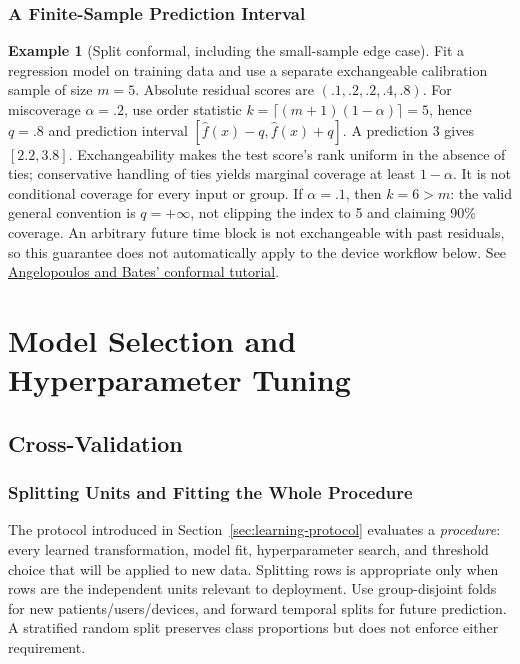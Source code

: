 \documentclass[11pt,twoside]{article}
\numberwithin{equation}{section}
\theoremstyle{plain}
\theoremstyle{definition}
\newtheorem{example}[theorem]{Example}
\theoremstyle{remark}
\begin{document}
\subsubsection{A Finite-Sample Prediction Interval}
\begin{example}[Split conformal, including the small-sample edge case]
Fit a regression model on training data and use a separate exchangeable
calibration sample of size $m=5$. Absolute residual scores are
$(.1,.2,.2,.4,.8)$. For miscoverage $\alpha=.2$, use order statistic
$k=\lceil(m+1)(1-\alpha)\rceil=5$, hence $q=.8$ and prediction interval
$[\hat f(x)-q,\hat f(x)+q]$. A prediction 3 gives $[2.2,3.8]$.
Exchangeability makes the test score's rank uniform in the absence of ties;
conservative handling of ties yields marginal coverage at least $1-\alpha$.
It is not conditional coverage for every input or group.
If $\alpha=.1$, then $k=6>m$: the valid general convention is $q=+\infty$,
not clipping the index to 5 and claiming 90\% coverage.
An arbitrary future time block is not exchangeable with past residuals, so
this guarantee does not automatically apply to the device workflow below.
See \href{https://arxiv.org/abs/2107.07511}{Angelopoulos and Bates' conformal tutorial}.
\end{example}

\section{Model Selection and Hyperparameter Tuning}
\label{sec:evaluation-protocol}

\subsection{Cross-Validation}

\subsubsection{Splitting Units and Fitting the Whole Procedure}
\label{sec:cv-protocol}
The protocol introduced in Section~\ref{sec:learning-protocol} evaluates a \emph{procedure}: every learned transformation, model fit, hyperparameter search, and threshold choice that will be applied to new data. Splitting rows is appropriate only when rows are the independent units relevant to deployment. Use group-disjoint folds for new patients/users/devices, and forward temporal splits for future prediction. A stratified random split preserves class proportions but does not enforce either requirement.
\end{document}
